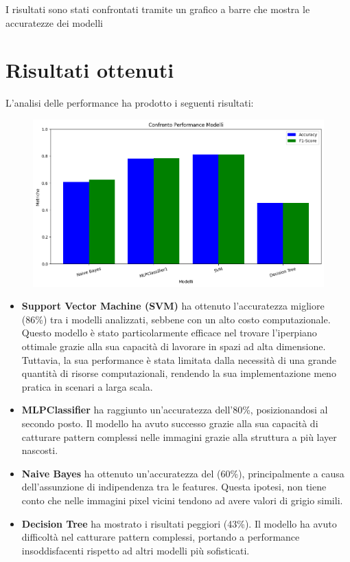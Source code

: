 \documentclass{article}
\begin{document}
I risultati sono stati confrontati tramite un grafico a barre che mostra le accuratezze dei modelli

\clearpage
\section{Risultati ottenuti}

L'analisi delle performance ha prodotto i seguenti risultati: 

\begin{figure}[H]
    \centering
    \includegraphics[scale=0.5]{Figures/output9.png}
\end{figure}

\begin{itemize}
    \item \textbf{Support Vector Machine (SVM)} ha ottenuto l'accuratezza migliore (86\%) tra i 
    modelli analizzati, sebbene con un alto costo computazionale. 
    Questo modello è stato particolarmente efficace nel trovare l'iperpiano ottimale grazie alla sua 
    capacità di lavorare in spazi ad alta dimensione. Tuttavia, la sua performance è stata limitata 
    dalla necessità di una grande quantità di risorse computazionali, rendendo la sua implementazione 
    meno pratica in scenari a larga scala.
    
    \item \textbf{MLPClassifier} ha raggiunto un'accuratezza dell'80\%, posizionandosi al secondo 
    posto. Il modello ha avuto successo grazie alla sua capacità di catturare pattern complessi 
    nelle immagini grazie alla struttura a più layer nascosti. 
    
    \item \textbf{Naive Bayes} ha ottenuto un'accuratezza del (60\%), principalmente a causa 
    dell'assunzione di indipendenza tra le features. 
    Questa ipotesi, non tiene conto che nelle immagini pixel vicini tendono ad avere valori di grigio simili.
    
    \item \textbf{Decision Tree} ha mostrato i risultati peggiori (43\%). 
    Il modello ha avuto difficoltà nel catturare pattern complessi, portando a performance 
    insoddisfacenti rispetto ad altri modelli più sofisticati. 
\end{itemize}
\end{document}
